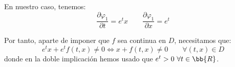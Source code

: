 \documentclass[12pt]{article}
\begin{document}
\begin{ejercicio}
\begin{enumerate}
            En nuestro caso, tenemos:
            \begin{equation*}
                \dfrac{\partial \varphi_1}{\partial t}=e^tx\qquad \dfrac{\partial \varphi_1}{\partial x}=e^t
            \end{equation*}

            Por tanto, aparte de imponer que $f$ sea continua en $D$, necesitamos que:
            \begin{equation*}
                e^tx+e^tf(t,x)\neq 0\Longleftrightarrow
                x+f(t,x)\neq 0\qquad \forall (t,x)\in D
            \end{equation*}
            donde en la doble implicación hemos usado que $e^t>0~\forall t\in\bb{R}$.
        \end{enumerate}
    \end{ejercicio}
\end{document}
